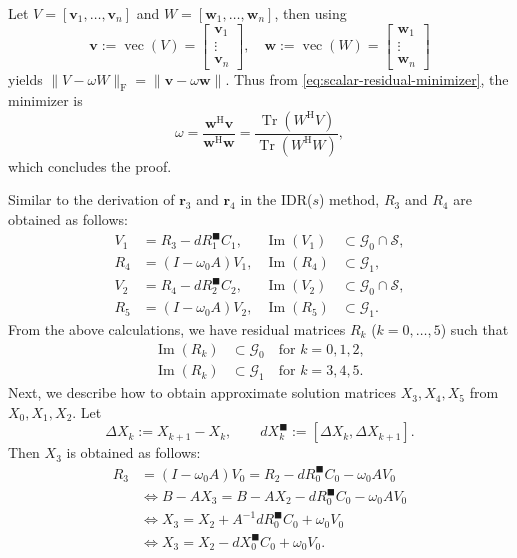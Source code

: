 \begin{Proof}
{Let $V=[\bm v_1,\ldots,\bm v_n]$ and $W=[\bm w_1,\ldots,\bm w_n]$, then using}
\[\bm v:=\operatorname{vec}(V)=\begin{bmatrix}\bm v_1\\\vdots\\\bm v_n\end{bmatrix},\quad\bm w:=\operatorname{vec}(W)=\begin{bmatrix}\bm w_1\\\vdots\\\bm w_n\end{bmatrix}\]
{yields $\|V-\omega W\|_{\mathrm F}=\|\bm v-\omega\bm w\|$. Thus from \eqref{eq:scalar-residual-minimizer}, the minimizer is}
\[\omega=\frac{\bm w^{\mathrm H}\bm v}{\bm w^{\mathrm H}\bm w}=\frac{\operatorname{Tr}(W^{\mathrm H}V)}{\operatorname{Tr}(W^{\mathrm H}W)},\]
{which concludes the proof.}
\par\nopagebreak[4]
\end{Proof}
{Similar to the derivation of $\bm r_3$ and $\bm r_4$ in the IDR($s$) method, $R_3$ and $R_4$ are obtained as follows:}
\[\begin{aligned}V_1&=R_3-dR_1^{\blacksquare}C_1,&\operatorname{Im}(V_1)&\subset\mathcal G_0\cap\mathcal S,\\R_4&=(I-\omega_0A)V_1,&\operatorname{Im}(R_4)&\subset\mathcal G_1,\\V_2&=R_4-dR_2^{\blacksquare}C_2,&\operatorname{Im}(V_2)&\subset\mathcal G_0\cap\mathcal S,\\R_5&=(I-\omega_0A)V_2,&\operatorname{Im}(R_5)&\subset\mathcal G_1.\end{aligned}\]
{From the above calculations, we have residual matrices $R_k$ ($k=0,\ldots,5$) such that}
\[\begin{aligned}\operatorname{Im}(R_k)&\subset\mathcal G_0\quad\text{for }k=0,1,2,\\\operatorname{Im}(R_k)&\subset\mathcal G_1\quad\text{for }k=3,4,5.\end{aligned}\]
{Next, we describe how to obtain approximate solution matrices $X_3,X_4,X_5$ from $X_0,X_1,X_2$. Let}
\[\Delta X_k:=X_{k+1}-X_k,\qquad dX_k^{\blacksquare}:=[\Delta X_k,\Delta X_{k+1}].\]
{Then $X_3$ is obtained as follows:}
\[\begin{aligned}R_3&=(I-\omega_0A)V_0=R_2-dR_0^{\blacksquare}C_0-\omega_0AV_0\\&\Leftrightarrow B-AX_3=B-AX_2-dR_0^{\blacksquare}C_0-\omega_0AV_0\\&\Leftrightarrow X_3=X_2+A^{-1}dR_0^{\blacksquare}C_0+\omega_0V_0\\&\Leftrightarrow X_3=X_2-dX_0^{\blacksquare}C_0+\omega_0V_0.\end{aligned}\]

